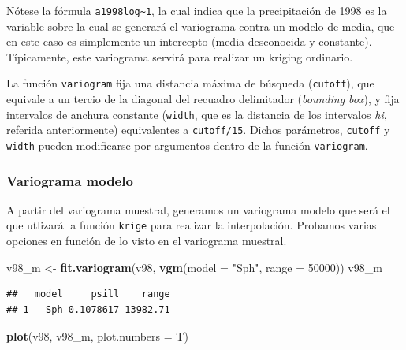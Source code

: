 \documentclass[11pt,]{article}
\newenvironment{Shaded}{\begin{snugshade}}{\end{snugshade}}
\newcommand{\KeywordTok}[1]{\textcolor[rgb]{0.13,0.29,0.53}{\textbf{#1}}}
\newcommand{\DataTypeTok}[1]{\textcolor[rgb]{0.13,0.29,0.53}{#1}}
\newcommand{\DecValTok}[1]{\textcolor[rgb]{0.00,0.00,0.81}{#1}}
\newcommand{\StringTok}[1]{\textcolor[rgb]{0.31,0.60,0.02}{#1}}
\newcommand{\NormalTok}[1]{#1}
\begin{document}
Nótese la fórmula \texttt{a1998log\textasciitilde{}1}, la cual indica
que la precipitación de 1998 es la variable sobre la cual se generará el
variograma contra un modelo de media, que en este caso es simplemente un
intercepto (media desconocida y constante). Típicamente, este variograma
servirá para realizar un kriging ordinario.

La función \texttt{variogram} fija una distancia máxima de búsqueda
(\texttt{cutoff}), que equivale a un tercio de la diagonal del recuadro
delimitador (\emph{bounding box}), y fija intervalos de anchura
constante (\texttt{width}, que es la distancia de los intervalos
\emph{hi}, referida anteriormente) equivalentes a \texttt{cutoff/15}.
Dichos parámetros, \texttt{cutoff} y \texttt{width} pueden modificarse
por argumentos dentro de la función \texttt{variogram}.

\subsubsection{Variograma modelo}\label{variograma-modelo}

A partir del variograma muestral, generamos un variograma modelo que
será el que utlizará la función \texttt{krige} para realizar la
interpolación. Probamos varias opciones en función de lo visto en el
variograma muestral.

\begin{Shaded}
\begin{Highlighting}[]
\NormalTok{v98_m <-}\StringTok{ }\KeywordTok{fit.variogram}\NormalTok{(v98, }\KeywordTok{vgm}\NormalTok{(}\DataTypeTok{model =} \StringTok{"Sph"}\NormalTok{, }\DataTypeTok{range =} \DecValTok{50000}\NormalTok{))}
\NormalTok{v98_m}
\end{Highlighting}
\end{Shaded}

\begin{verbatim}
##   model     psill    range
## 1   Sph 0.1078617 13982.71
\end{verbatim}

\begin{Shaded}
\begin{Highlighting}[]
\KeywordTok{plot}\NormalTok{(v98, v98_m, }\DataTypeTok{plot.numbers =}\NormalTok{ T)}
\end{Highlighting}
\end{Shaded}
\end{document}
